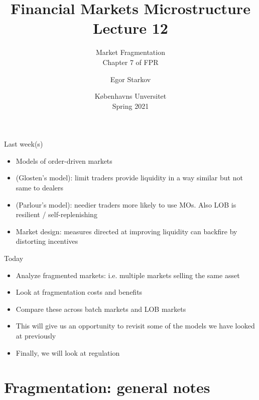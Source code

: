 \documentclass[english,10pt
,aspectratio=169
]{beamer}
\title{Financial Markets Microstructure \\ Lecture 12}
\subtitle{Market Fragmentation\\
	Chapter 7 of FPR}
\author{Egor Starkov}
\date{K{\o}benhavns Unversitet \\
	Spring 2021}
\begin{document}
\frame[plain]{\titlepage}


\begin{frame}{Last week(s)}
	\begin{itemize}
		\item Models of order-driven markets
		\item (Glosten's model): limit traders provide liquidity in a way similar but not same to dealers
		\item (Parlour's model): needier traders more likely to use MOs. Also LOB is resilient / self-replenishing
		\item Market design: measures directed at improving liquidity can backfire by distorting incentives
	\end{itemize}
\end{frame}


\begin{frame}{Today}
	\begin{itemize}
		\item Analyze fragmented markets: i.e. multiple markets selling the same asset
		\item Look at fragmentation costs and benefits
		\item Compare these across batch markets and LOB markets
		\item This will give us an opportunity to revisit some of the models we have looked at previously
		\item Finally, we will look at regulation
	\end{itemize}
\end{frame}



\section{Fragmentation: general notes}
\end{document}
